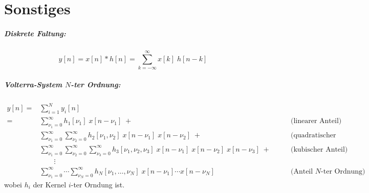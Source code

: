 \chapter{Sonstiges}

\paragraph{Diskrete Faltung:}
\begin{equation}
  y[n] = x[n] * h[n] = \sum_{k=-\infty}^{\infty} x[k] \; h[n-k] 
\end{equation}

\paragraph{Volterra-System $N$-ter Ordnung:}
\begin{equation}
 \begin{aligned}
  y[n] = & \sum_{i=1}^N y_i[n] \\
       = & \sum_{\nu_1=0}^{\infty} h_1[\nu_1] \; x[n-\nu_1] \; +    \qquad & \text{(linearer Anteil)} \\
         & \sum_{\nu_1=0}^{\infty} \sum_{\nu_2=0}^{\infty}  
           h_2[\nu_1, \nu_2] \; x[n-\nu_1] \; x[n-\nu_2] \; +          \qquad & \text{(quadratischer Anteil)} \\  
         & \sum_{\nu_1=0}^{\infty} \sum_{\nu_2=0}^{\infty} \sum_{\nu_3=0}^{\infty} 
           h_3[\nu_1, \nu_2, \nu_3] \; x[n-\nu_1] \; x[n-\nu_2] \; x[n-\nu_3] \; +          
           \qquad & \text{(kubischer Anteil)} \\   
         & \qquad \vdots \\
         & \sum_{\nu_1=0}^{\infty} \cdots \sum_{\nu_N=0}^{\infty}  
           h_N[\nu_1, \ldots, \nu_N] \; x[n-\nu_1] \cdots x[n-\nu_N] \; \qquad & \text{(Anteil $N$-ter Ordnung)} 
 \end{aligned}
\end{equation}
wobei $h_i$ der Kernel $i$-ter Orndung ist. 